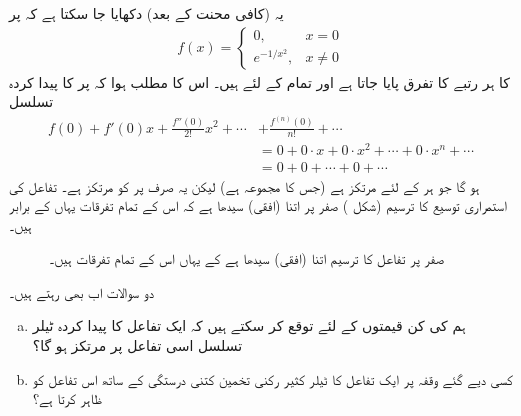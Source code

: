 یہ (کافی محنت کے بعد) دکھایا جا سکتا ہے کہ  پر
 \begin{align*}
f(x)=
\begin{cases}
0,&x=0\\
e^{-1/x^2},&x\ne 0
\end{cases}
\end{align*}
کا ہر رتبے کا تفرق پایا جاتا ہے اور تمام  کے لئے  ہیں۔ اس کا مطلب ہوا کہ  پر  کا پیدا کردہ تسلسل
\begin{align*}
f(0)+f'(0)x+\frac{f''(0)}{2!}x^2+\cdots &+\frac{f^{(n)}(0)}{n!}+\cdots\\
&=0+0\cdot x+0\cdot x^2+\cdots+0\cdot x^n+\cdots\\
&=0+0+\cdots+0+\cdots
\end{align*}
ہو گا جو ہر  کے لئے مرتکز ہے (جس کا مجموعہ  ہے) لیکن یہ صرف  پر  کو مرتکز ہے۔  تفاعل  کی استمراری توسیع کا ترسیم (شکل ) صفر پر اتنا (افقی) سیدھا ہے کہ اس کے تمام تفرقات یہاں  کے برابر ہیں۔
\begin{figure}
\centering
{}
\caption{صفر پر تفاعل کا ترسیم اتنا (افقی) سیدھا ہے  کے یہاں اس کے تمام تفرقات  ہیں۔}
\label{شکل_مثال_تسلسل_مرکوز_لیکن_تفاعل_کو_نہیں}
\end{figure}


دو سوالات اب بھی رہتے ہیں۔
\begin{enumerate}[a.]
\item
ہم  کی کن قیمتوں کے لئے توقع کر سکتے ہیں کہ ایک تفاعل کا پیدا کردہ ٹیلر تسلسل اسی تفاعل پر مرتکز ہو گا؟
\item
کسی دیے گئے وقفہ پر ایک تفاعل  کا ٹیلر کثیر رکنی تخمین کتنی درستگی کے ساتھ اس تفاعل کو ظاہر کرتا ہے؟
\end{enumerate} 

